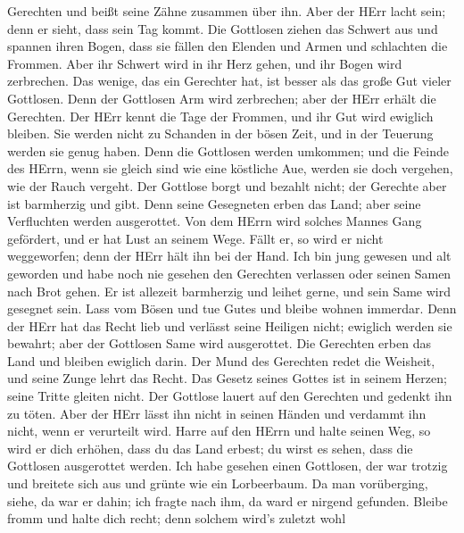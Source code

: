 Gerechten und beißt seine Zähne zusammen über ihn.  Aber
der HErr lacht sein; denn er sieht, dass sein Tag kommt. 
Die Gottlosen ziehen das Schwert aus und spannen ihren Bogen, dass sie
fällen den Elenden und Armen und schlachten die Frommen. 
Aber ihr Schwert wird in ihr Herz gehen, und ihr Bogen wird zerbrechen.
 Das wenige, das ein Gerechter hat, ist besser als das
große Gut vieler Gottlosen.  Denn der Gottlosen Arm wird
zerbrechen; aber der HErr erhält die Gerechten.  Der HErr
kennt die Tage der Frommen, und ihr Gut wird ewiglich bleiben.
 Sie werden nicht zu Schanden in der bösen Zeit, und in der
Teuerung werden sie genug haben.  Denn die Gottlosen werden
umkommen; und die Feinde des HErrn, wenn sie gleich sind wie eine
köstliche Aue, werden sie doch vergehen, wie der Rauch vergeht.
 Der Gottlose borgt und bezahlt nicht; der Gerechte aber
ist barmherzig und gibt.  Denn seine Gesegneten erben das
Land; aber seine Verfluchten werden ausgerottet.  Von dem
HErrn wird solches Mannes Gang gefördert, und er hat Lust an seinem
Wege.  Fällt er, so wird er nicht weggeworfen; denn der
HErr hält ihn bei der Hand.  Ich bin jung gewesen und alt
geworden und habe noch nie gesehen den Gerechten verlassen oder seinen
Samen nach Brot gehen.  Er ist allezeit barmherzig und
leihet gerne, und sein Same wird gesegnet sein.  Lass vom
Bösen und tue Gutes und bleibe wohnen immerdar.  Denn der
HErr hat das Recht lieb und verlässt seine Heiligen nicht; ewiglich
werden sie bewahrt; aber der Gottlosen Same wird ausgerottet.
 Die Gerechten erben das Land und bleiben ewiglich darin.
 Der Mund des Gerechten redet die Weisheit, und seine Zunge
lehrt das Recht.  Das Gesetz seines Gottes ist in seinem
Herzen; seine Tritte gleiten nicht.  Der Gottlose lauert
auf den Gerechten und gedenkt ihn zu töten.  Aber der HErr
lässt ihn nicht in seinen Händen und verdammt ihn nicht, wenn er
verurteilt wird.  Harre auf den HErrn und halte seinen Weg,
so wird er dich erhöhen, dass du das Land erbest; du wirst es sehen,
dass die Gottlosen ausgerottet werden.  Ich habe gesehen
einen Gottlosen, der war trotzig und breitete sich aus und grünte wie
ein Lorbeerbaum.  Da man vorüberging, siehe, da war er
dahin; ich fragte nach ihm, da ward er nirgend gefunden. 
Bleibe fromm und halte dich recht; denn solchem wird's zuletzt wohl
